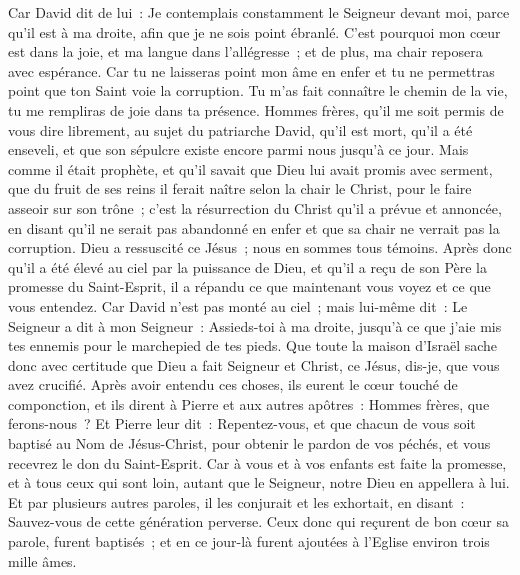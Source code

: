 \begin{multicols}{2}
Car David dit de lui~: Je contemplais constamment le Seigneur devant moi, parce qu'il est à ma droite, afin que je ne sois point ébranlé.
C'est pourquoi mon cœur est dans la joie, et ma langue dans l'allégresse~; et de plus, ma chair reposera avec espérance.
Car tu ne laisseras point mon âme en enfer et tu ne permettras point que ton Saint voie la corruption.
Tu m'as fait connaître le chemin de la vie, tu me rempliras de joie dans ta présence.
Hommes frères, qu'il me soit permis de vous dire librement, au sujet du patriarche David, qu'il est mort, qu'il a été enseveli, et que son sépulcre existe encore parmi nous jusqu'à ce jour.
Mais comme il était prophète, et qu'il savait que Dieu lui avait promis avec serment, que du fruit de ses reins il ferait naître selon la chair le Christ, pour le faire asseoir sur son trône~;
c'est la résurrection du Christ qu'il a prévue et annoncée, en disant qu'il ne serait pas abandonné en enfer et que sa chair ne verrait pas la corruption.
Dieu a ressuscité ce Jésus~; nous en sommes tous témoins.
Après donc qu'il a été élevé au ciel par la puissance de Dieu, et qu'il a reçu de son Père la promesse du Saint-Esprit, il a répandu ce que maintenant vous voyez et ce que vous entendez.
Car David n'est pas monté au ciel~; mais lui-même dit~: Le Seigneur a dit à mon Seigneur~: Assieds-toi à ma droite,
jusqu'à ce que j'aie mis tes ennemis pour le marchepied de tes pieds. 
Que toute la maison d'Israël sache donc avec certitude que Dieu a fait Seigneur et Christ, ce Jésus, dis-je, que vous avez crucifié.
Après avoir entendu ces choses, ils eurent le cœur touché de componction, et ils dirent à Pierre et aux autres apôtres~: Hommes frères, que ferons-nous~?
Et Pierre leur dit~: Repentez-vous, et que chacun de vous soit baptisé au Nom de Jésus-Christ, pour obtenir le pardon de vos péchés, et vous recevrez le don du Saint-Esprit.
Car à vous et à vos enfants est faite la promesse, et à tous ceux qui sont loin, autant que le Seigneur, notre Dieu en appellera à lui.
Et par plusieurs autres paroles, il les conjurait et les exhortait, en disant~: Sauvez-vous de cette génération perverse.
Ceux donc qui reçurent de bon cœur sa parole, furent baptisés~; et en ce jour-là furent ajoutées à l'Eglise environ trois mille âmes.

\end{multicols}
